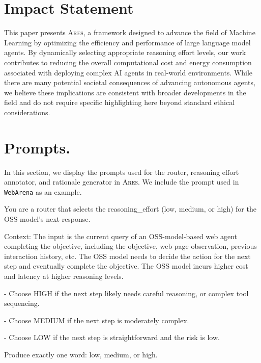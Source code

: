 \documentclass{article}
\newcommand{\ares}{\textsc{Ares}}
\theoremstyle{plain}
\theoremstyle{definition}
\theoremstyle{remark}
\begin{document}
\section*{Impact Statement}

This paper presents {\ares}, a framework designed to advance the field of Machine Learning by optimizing the efficiency and performance of large language model agents. By dynamically selecting appropriate reasoning effort levels, our work contributes to reducing the overall computational cost and energy consumption associated with deploying complex AI agents in real-world environments. While there are many potential societal consequences of advancing autonomous agents, we believe these implications are consistent with broader developments in the field and do not require specific highlighting here beyond standard ethical considerations.





\newpage
\appendix
\onecolumn
\section{Prompts.}
In this section, we display the prompts used for the router, reasoning effort annotator, and rationale generator in {\ares}. We include the prompt used in \texttt{WebArena} as an example.

\begin{tcolorbox}[enhanced jigsaw, breakable, title=Router, colback=gray!3, colframe=blue!50]
\ttfamily
You are a router that selects the reasoning\_effort (low, medium, or high) for the OSS model's next response.

Context: The input is the current query of an OSS-model-based web agent completing the objective, including the objective, web page observation, previous interaction history, etc. The OSS model needs to decide the action for the next step and eventually complete the objective. The OSS model incurs higher cost and latency at higher reasoning levels.

- Choose HIGH if the next step likely needs careful reasoning, or complex tool sequencing.

- Choose MEDIUM if the next step is moderately complex.

- Choose LOW if the next step is straightforward and the risk is low.

Produce exactly one word: low, medium, or high.
\end{tcolorbox}
\end{document}
